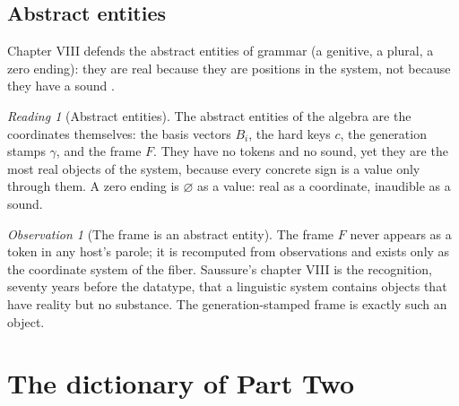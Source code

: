 \documentclass[11pt,a4paper]{article}
\theoremstyle{remark}
\newtheorem{observation}[principle]{Observation}
\newtheorem{reading}[principle]{Reading}
\newcommand{\Gen}{\ensuremath{\gamma}}                   %
\begin{document}
\subsection{Abstract entities}
\label{sec:abstract}

Chapter VIII defends the abstract entities of grammar (a genitive, a plural,
a zero ending): they are real because they are positions in the system, not
because they have a sound \cite[Part II, ch.~VIII]{harris1983}.

\begin{reading}[Abstract entities]
\label{read:abstract}
The abstract entities of the algebra are the coordinates themselves: the
basis vectors $B_i$, the hard keys $c$, the generation stamps $\Gen$, and the
frame $F$. They have no tokens and no sound, yet they are the most real
objects of the system, because every concrete sign is a value only through
them. A zero ending is $\varnothing$ as a value: real as a coordinate,
inaudible as a sound.
\end{reading}

\begin{observation}[The frame is an abstract entity]
The frame $F$ never appears as a token in any host's parole; it is recomputed
from observations and exists only as the coordinate system of the fiber.
Saussure's chapter VIII is the recognition, seventy years before the
datatype, that a linguistic system contains objects that have reality but no
substance. The generation-stamped frame is exactly such an object.
\end{observation}

\section{The dictionary of Part Two}
\label{sec:dictionary}
\end{document}
